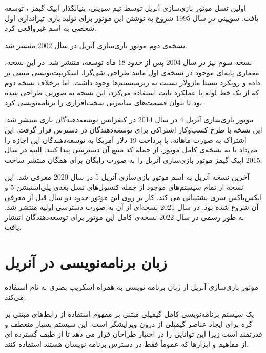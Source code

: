 اولین نسل موتور بازی‌سازی آنریل توسط تیم سوینی، بنیانگذار اپیک گیمز
،
توسعه یافت.
سویینی در سال 1995 شروع به نوشتن این موتور برای تولید بازی‌ تیراندازی اول شخصی به اسم غیرواقعی
کرد.


نسخه‌‌ی دوم موتور بازی‌سازی آنریل در سال 2002 منتشر شد. 

نسخه سوم نیز در سال 2004 پس از حدود 18 ماه توسعه، منتشر شد.
در این نسخه، معماری پایه‌ای موجود در نسخه‌ی اول مانند طراحی شی‌گرا، اسکریپت‌نویسی مبتنی بر داده و رویکرد نسبتا ماژولار نسبت به زیرسیستم‌ها وجود داشت.
اما برخلاف نسخه دوم که از یک خط لوله با عملکرد ثابت
استفاده می‌کرد، این نسخه به صورتی طراحی شده بود تا بتوان قسمت‌های سایه‌زنی سخت‌افزاری
را برنامه‌نویسی کرد.


موتور بازی‌سازی آنریل 4 در سال 2014 در کنفرانس توسعه‌دهندگان بازی
منتشر شد.
این نسخه با طرح کسب‌و‌کار اشتراکی برای توسعه‌دهندگان در دسترس قرار گرفت. این اشتراک به صورت ماهانه، با پرداخت 19 دلار آمریکا به توسعه‌دهندگان این اجازه را می‌داد تا به نسخه‌ی کامل موتور، از جمله کد منبع 
آن
دسترسی پیدا‌ کنند.
البته در سال 2015 اپیک گیمز موتور بازی‌سازی آنریل را به صورت رایگان برای همگان منتشر ساخت.

آخرین نسخه آنریل به اسم موتور بازی‌سازی آنریل 5 در سال 2020 معرفی شد. این نسخه از تمام سیستم‌های موجود از جمله کنسول‌های نسل بعدی پلی‌استیشن 5
و ایکس‌باکس سری 
پشتیبانی می کند.
کار بر روی این موتور حدود دو سال قبل از معرفی آن شروع شده بود. در سال 2021 نسخه‌ای از آن به صورت دسترسی اولیه منتشر شد. به طور رسمی در سال 2022 نسخه‌ی کامل این موتور برای توسعه‌دهندگان انتشار یافت.
\cite{UnrealEngineWikiPedia}

\section{زبان برنامه‌نویسی در آنریل}

موتور بازی‌سازی آنریل از زبان برنامه نویسی 
به همراه اسکریپ بصری به نام 
استفاده می‌کند.

یک سیستم برنامه‌نویسی کامل گیمپلی مبتنی بر مفهوم استفاده از رابط‌های مبتنی بر گره برای ایجاد عناصر گیمپلی از درون ویرایشگر است.
این سیستم بسیار منعطف و قدرتمند است زیرا این توانایی را در اختیار طراحان قرار می دهد تا از طیف گسترده ای از مفاهیم و ابزارها که عموماً فقط در دسترس برنامه نویسان هستند استفاده کنند.
\cite{UnrealEngineBlueprint}

